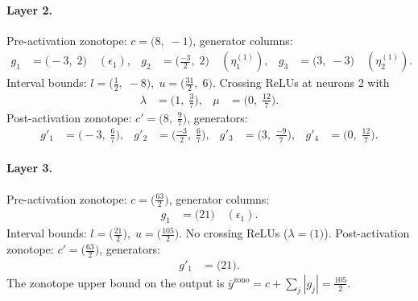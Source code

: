 \documentclass[11pt]{article}
\begin{document}
\paragraph{Layer 2.}
Pre-activation zonotope: $c = \bigl(8,\; -1\bigr)$, generator columns:
\begin{align*}
g_{1} &= \bigl(-3,\; 2\bigr) \quad (\epsilon_{1}), &
g_{2} &= \bigl(\frac{-3}{2},\; 2\bigr) \quad (\eta^{(1)}_{1}), &
g_{3} &= \bigl(3,\; -3\bigr) \quad (\eta^{(1)}_{2}).
\end{align*}
Interval bounds: $l = \bigl(\frac{1}{2},\; -8\bigr), \; u = \bigl(\frac{31}{2},\; 6\bigr)$. 
Crossing ReLUs at neurons 2 with
\begin{align*}
\lambda &= \bigl(1,\; \frac{3}{7}\bigr), & \mu &= \bigl(0,\; \frac{12}{7}\bigr).
\end{align*}
Post-activation zonotope: $c' = \bigl(8,\; \frac{9}{7}\bigr)$, generators:
\begin{align*}
g'_{1} &= \bigl(-3,\; \frac{6}{7}\bigr), &
g'_{2} &= \bigl(\frac{-3}{2},\; \frac{6}{7}\bigr), &
g'_{3} &= \bigl(3,\; \frac{-9}{7}\bigr), &
g'_{4} &= \bigl(0,\; \frac{12}{7}\bigr).
\end{align*}
\paragraph{Layer 3.}
Pre-activation zonotope: $c = \bigl(\frac{63}{2}\bigr)$, generator columns:
\begin{align*}
g_{1} &= \bigl(21\bigr) \quad (\epsilon_{1}).
\end{align*}
Interval bounds: $l = \bigl(\frac{21}{2}\bigr), \; u = \bigl(\frac{105}{2}\bigr)$. 
No crossing ReLUs ($\lambda = \bigl(1\bigr)$).
Post-activation zonotope: $c' = \bigl(\frac{63}{2}\bigr)$, generators:
\begin{align*}
g'_{1} &= \bigl(21\bigr).
\end{align*}
The zonotope upper bound on the output is $\overline{y}^{\text{zono}} = c + \sum_j |g_j| = \frac{105}{2}$.
\end{document}
